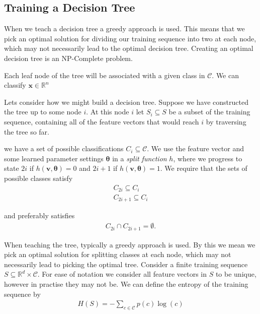\documentclass{article}
\newcommand{\vc}[1]{
    \mathbf{#1}
 }
\theoremstyle{definition}
\begin{document}
\subsection{Training a Decision Tree}

When we teach a decision tree a greedy approach is used. This means that we 
pick an optimal solution for dividing our training sequence into two at each 
node, which may not necessarily lead to the optimal decision tree. Creating an 
optimal decision tree is an NP-Complete problem. 



 Each leaf node of the tree will be associated with a given class in 
$\mathcal{C}$. We can
classify $\vc{x}\in\mathbb{R}^n$

Lets consider how we might build a decision tree. Suppose we have constructed 
the tree up to some node $i$. At this node $i$ let $S_i \subseteq S$ be a 
subset of the training sequence, containing all of the feature vectors that 
would reach $i$ by traversing the tree so far. 

we have a set of possible 
classifications 
$C_i \subseteq \mathcal{C}$. We use the feature vector and some learned 
parameter settings $\vc{\theta}$ in a \textit{split function} $h$, where we 
progress to state $2i$ if $h(\vc{v}, \vc{\theta}) = 0$ and $2i+1$ if $h(\vc{v}, 
\vc{\theta}) = 1$. We require that the sets of possible classes satisfy
\begin{align}
    C_{2i} \subseteq C_{i} \\
    C_{2i+1} \subseteq C_{i}
\end{align}

and preferably satisfies
\begin{align}
    C_{2i} \cap C_{2i+1} = \emptyset.
\end{align} 





When teaching the tree, typically a greedy approach is used. By this we mean we pick an optimal solution for splitting 
classes at each node, which may not necessarily lead to picking the optimal tree. Consider a finite training sequence $S 
\subseteq \mathbb{R}^d \times \mathcal{C}$. For ease of notation we consider all feature vectors in $S$ to be unique, 
however in practise they may not be. We can define the entropy of the training sequence by
\begin{align}
    H(S) = - \sum_{c\in\mathcal{C}} p(c) \log (c)
\end{align}
\end{document}
